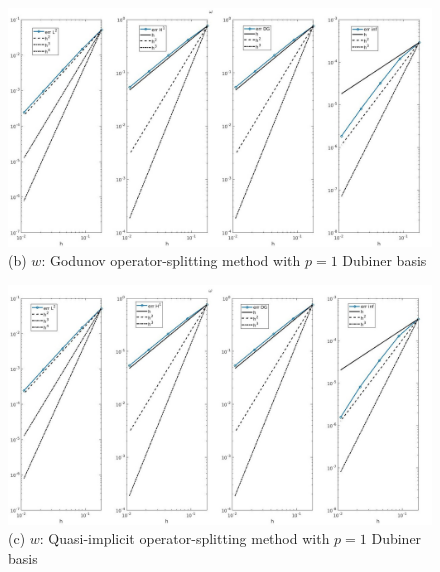 \documentclass[a4paper,11pt]{article}
\begin{document}
\begin{figure}[h]
\begin{center}
\includegraphics[width =\textwidth]{./errors/D1_w_1_GO.jpg}
\caption*{(b) $w$: Godunov operator-splitting method with $p=1$ Dubiner basis}
\end{center}
\end{figure}
\begin{figure}[H]
\begin{center}
\includegraphics[width =\textwidth]{./errors/D1_w_1_OS.jpg}
\caption*{(c) $w$: Quasi-implicit operator-splitting method with $p=1$ Dubiner basis}
\end{center}
\end{figure}
\restoregeometry
\newpage
\end{document}
